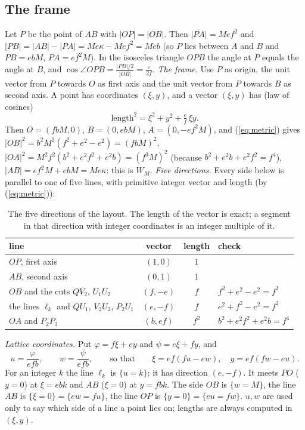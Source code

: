 \documentclass[11pt,reqno]{amsart}
\theoremstyle{plain}
\theoremstyle{definition}
\begin{document}
\subsection{The frame}\label{sub:frame}
Let $P$ be the point of $AB$ with $|OP|=|OB|$. Then $|PA|=Mef^2$ and $|PB|=|AB|-|PA|=Me\kappa-Mef^2=Meb$ (so $P$ lies between $A$ and $B$ and $PB=ebM$, $PA=ef^2M$). In the isosceles triangle $OPB$ the angle at $P$ equals the angle at $B$, and $\cos\angle OPB=\frac{|PB|/2}{|OB|}=\frac{e}{2f}$.
\emph{The frame.} Use $P$ as origin, the unit vector from $P$ towards $O$ as first axis and the unit vector from $P$ towards $B$ as second axis. A point has coordinates $(\xi,y)$, and a vector $(\xi,y)$ has (law of cosines)
\begin{equation}\label{eq:metric}
\text{length}^2=\xi^2+y^2+\tfrac ef\,\xi y .
\end{equation}
Then $O=(fbM,0)$, $B=(0,ebM)$, $A=(0,-ef^2M)$, and (\ref{eq:metric}) gives $|OB|^2=b^2M^2(f^2+e^2-e^2)=(fbM)^2$, $|OA|^2=M^2f^2(b^2+e^2f^2+e^2b)=(f^3M)^2$ (because $b^2+e^2b+e^2f^2=f^4$), $|AB|=ef^2M+ebM=Me\kappa$: this is $W_M$.
\emph{Five directions.} Every side below is parallel to one of five lines, with primitive integer vector and length (by (\ref{eq:metric})):
\begin{table}[ht]
\centering\small
\caption{The five directions of the layout. The length of the vector is exact; a segment in that direction with integer coordinates is an integer multiple of it.}\label{tab:dirs}
\begin{tabular}{@{}lccl@{}}
\toprule
line & vector & length & check\\
\midrule
$OP$, first axis & $(1,0)$ & $1$ & \\
$AB$, second axis & $(0,1)$ & $1$ & \\
$OB$ and the cuts $QV_2$, $U_1U_2$ & $(f,-e)$ & $f$ & $f^2+e^2-e^2=f^2$\\
the lines $\ell_k$ and $QU_1$, $V_2U_2$, $P_2U_1$ & $(e,-f)$ & $f$ & $e^2+f^2-e^2=f^2$\\
$OA$ and $P_2P_3$ & $(b,ef)$ & $f^2$ & $b^2+e^2f^2+e^2b=f^4$\\
\bottomrule
\end{tabular}
\end{table}
\emph{Lattice coordinates.} Put $\varphi=f\xi+ey$ and $\psi=e\xi+fy$, and
\[
u=\frac{\varphi}{efb},\qquad w=\frac{\psi}{efb},\qquad\text{so that}\qquad \xi=ef(fu-ew),\quad y=ef(fw-eu).
\]
For an integer $k$ the line $\ell_k$ is $\{u=k\}$; it has direction $(e,-f)$. It meets $PO$ ($y=0$) at $\xi=ebk$ and $AB$ ($\xi=0$) at $y=fbk$. The side $OB$ is $\{w=M\}$, the line $AB$ is $\{\xi=0\}=\{ew=fu\}$, the line $OP$ is $\{y=0\}=\{eu=fw\}$.
$u,w$ are used only to say which side of a line a point lies on; lengths are always computed in $(\xi,y)$.
\end{document}
